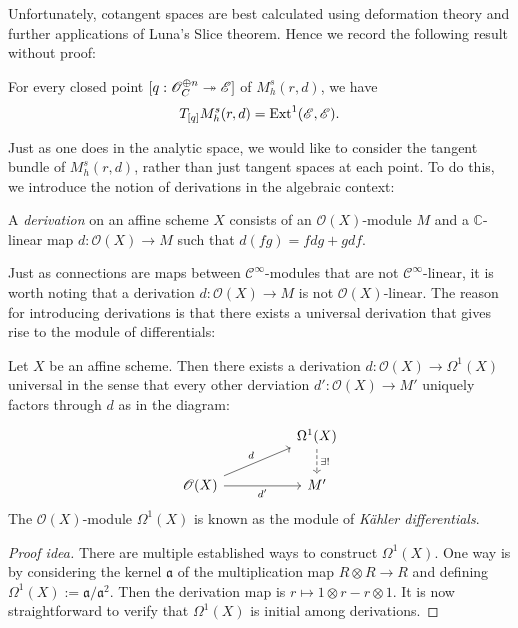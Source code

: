 \documentclass[12pt]{ociamthesis}  %
\begin{document}
Unfortunately, cotangent spaces are best calculated using deformation
theory and further applications of Luna's Slice theorem. \cite[Corollary 4.5.2]{huybrechts2010}
Hence we record the following result without proof:

\begin{theorem}
  For every closed point $[q : \mathscr O^{\oplus n}_C \twoheadrightarrow \mathscr E]$ of
  $M^s_h(r,d)$, we have
  \begin{align*}
  T_{[q]} M^s_h(r,d) = \operatorname{Ext}^1(\mathscr E,\mathscr E).
  \end{align*}
\end{theorem}

Just as one does in the analytic space, we would like to consider the
tangent bundle of $M^s_h(r,d)$, rather than just tangent spaces at each
point. To do this, we introduce the notion of derivations in the algebraic
context:

\begin{definition}
  A \emph{derivation} on an affine scheme $X$ consists of
  an $\mathscr O(X)$-module $M$ and a $\mathbb C$-linear map
  $d : \mathscr O(X) \to M$ such that $d(fg) = fdg + gdf$.
\end{definition}

Just as connections are maps between $\mathscr C^\infty$-modules that
are not $\mathscr C^\infty$-linear, it is worth noting that a derivation
$d:\mathscr O(X)\to M$ is not $\mathscr O(X)$-linear. The reason for introducing derivations
is that there exists a universal derivation that
gives rise to the module of differentials:

\begin{theorem}\label{thm:kahler_differential}
  Let $X$ be an affine scheme. Then there exists a
  derivation $d : \mathscr O(X) \to \Omega^1(X)$ universal in the sense that
  every other derviation $d' : \mathscr O(X)\to M'$ uniquely factors through
  $d$ as in the diagram:
  \begin{equation*}
    \begin{tikzcd}
      && {\Omega^1(X)} \\
      \mathscr O(X) && {M'}
      \arrow["{\exists!}", dashed, from=1-3, to=2-3]
      \arrow["d", from=2-1, to=1-3]
      \arrow["{d'}"', from=2-1, to=2-3]
    \end{tikzcd}
  \end{equation*}
  The $\mathscr O(X)$-module $\Omega^1(X)$ is known as the module of
  \emph{K\"ahler differentials}.
  \begin{proof}[Proof idea]
    There are multiple established ways to construct $\Omega^1(X)$. One way is by
    considering the kernel $\mathfrak a$ of the multiplication map
    $R\otimes R \to R$ and defining $\Omega^1(X) := \mathfrak a/\mathfrak a^2$. Then the derivation
    map is $r \mapsto 1\otimes r - r \otimes 1$. It is now straightforward
    to verify that $\Omega^1(X)$ is initial among derivations.
    \end{proof}
\end{theorem}
\end{document}
